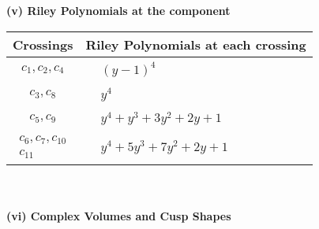 \documentclass[1p]{elsarticle_modified}
\theoremstyle{definition}
\begin{document}
\newpage\renewcommand{\arraystretch}{1}
\flushleft \textbf{(v) Riley Polynomials at the component}\newline \\
\begin{tabular}{m{50pt}|m{274pt}}
Crossings & \hspace{64pt}Riley Polynomials at each crossing \\
\hline $$\begin{aligned}c_{1},c_{2},c_{4}\end{aligned}$$&$\begin{aligned}
&(y-1)^4
\end{aligned}$\\
\hline $$\begin{aligned}c_{3},c_{8}\end{aligned}$$&$\begin{aligned}
&y^4
\end{aligned}$\\
\hline $$\begin{aligned}c_{5},c_{9}\end{aligned}$$&$\begin{aligned}
&y^4+y^3+3 y^2+2 y+1
\end{aligned}$\\
\hline $$\begin{aligned}c_{6},c_{7},c_{10}\\c_{11}\end{aligned}$$&$\begin{aligned}
&y^4+5 y^3+7 y^2+2 y+1
\end{aligned}$\\
\hline
\end{tabular}\\~\\
\newpage\flushleft \textbf{(vi) Complex Volumes and Cusp Shapes}
\end{document}
